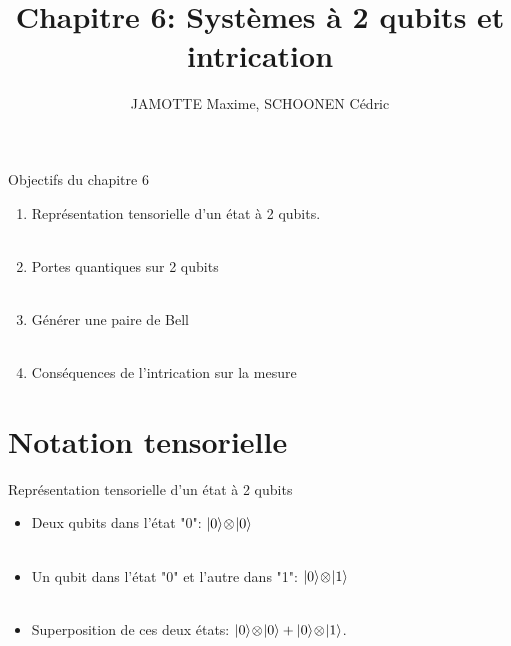 \documentclass[aspectratio=169,12pt]{beamer}
\title[Chapter 6]{Chapitre 6: Systèmes à 2 qubits et intrication}
\author{JAMOTTE Maxime, SCHOONEN Cédric}
\institute{Digital Learning Hub}
\date{}
\begin{document}
\begin{frame}
  \titlepage
\end{frame}



\begin{frame}{Objectifs du chapitre 6}
  \begin{enumerate}[<+->]
    \item Représentation tensorielle d'un état à 2 qubits.
    \\~\\
    \item Portes quantiques sur 2 qubits
    \\~\\
    \item Générer une paire de Bell
    \\~\\
    \item Conséquences de l'intrication sur la mesure
  \end{enumerate}
\end{frame}

\section{Notation tensorielle}

\begin{frame}{Représentation tensorielle d'un état à 2 qubits}
  \begin{itemize}[<+->]
    \item Deux qubits dans l'état "0": $\ket{0}\!\otimes\!\ket{0}$
    \\~\\
    \item Un qubit dans l'état "0" et l'autre dans "1": $\ket{0}\!\otimes\!\ket{1}$
    \\~\\
    \item Superposition de ces deux états: $\ket{0}\!\otimes\!\ket{0} + \ket{0}\!\otimes\!\ket{1}$.
  \end{itemize}
\end{frame}
\end{document}
